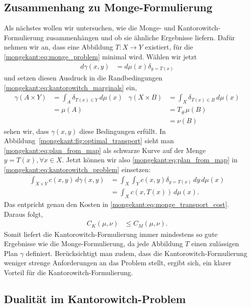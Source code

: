 \subsection{Zusammenhang zu Monge-Formulierung%
\label{mongekant:subsection:monge_kantorowitch_connection}}
Als nächstes wollen wir untersuchen,
wie die Monge- und Kantorowitch-Formulierung zusammenhängen und
ob sie ähnliche Ergebnisse liefern.
Dafür nehmen wir an,
dass eine Abbildung $T\colon X \to Y$ existiert,
für die \eqref{mongekant:eq:monge_problem} minimal wird.
Wählen wir jetzt
\begin{align}
d\gamma(x,y)
&=
d\mu(x) \delta_{y=T(x)}
\label{mongekant:eq:plan_from_map}
\end{align}
und setzen diesen Ausdruck
in die Randbedingungen \eqref{mongekant:eq:kantorowitch_marginals} ein,
\begin{align*}
\gamma(A \times Y)
&=
\int_A \delta_{T(x) \in Y}\, d\mu(x)
&
\gamma(X \times B)
&=
\int_X \delta_{T(x) \in B}\, d\mu(x)
\\
&=
\mu(A)
&&=
T_{\#}\mu\left(B\right)
\\
&&&=
\nu(B)
\end{align*}
sehen wir,
dass $\gamma(x,y)$ diese Bedingungen erfüllt.
In Abbildung~\ref{mongekant:fig:optimal_transport} sieht man 
\eqref{mongekant:eq:plan_from_map} als schwarze Kurve
auf der Menge $y = T(x), \forall x \in X$.
Jetzt können wir also \eqref{mongekant:eq:plan_from_map} in
\eqref{mongekant:eq:kantorowitch_problem} einsetzen:
\begin{align*}
\int_{X \times Y} c(x,y)\, d\gamma(x,y)
&=
\int_X \int_Y c(x,y) \delta_{y=T(x)}\, dy\, d\mu(x)
\\
&=
\int_X c(x, T(x))\, d\mu(x)
.
\end{align*}
Das entpricht genau den Kosten in \eqref{mongekant:eq:monge_transport_cost}.
Daraus folgt,
\begin{align*}
C_K(\mu, \nu)
&\leq
C_M(\mu, \nu)
.
\end{align*}
Somit liefert die Kantorowitch-Formulierung immer mindestens so gute Ergebnisse
wie die Monge-Formulierung,
da jede Abbildung $T$ einen zulässigen Plan $\gamma$ definiert.
Berücksichtigt man zudem,
dass die Kantorowitch-Formulierung weniger strenge Anforderungen an das Problem stellt,
ergibt sich,
ein klarer Vorteil für die Kantorowitch-Formulierung.

\subsection{Dualität im Kantorowitch-Problem%
\label{mongekant:subsection:kantorowitch_duality}}


